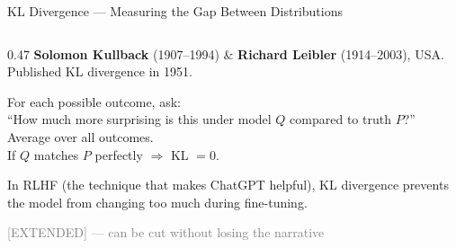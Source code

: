 \begin{frame}[shrink=22]{KL Divergence --- Measuring the Gap Between Distributions}

  \begin{columns}[T]
    \begin{column}{0.47\textwidth}
      {\footnotesize
      \textbf{Solomon Kullback} (1907--1994) \&
      \textbf{Richard Leibler} (1914--2003), USA.\\
      Published KL divergence in 1951.}

      \vspace{0.3em}
      \begin{tcolorbox}[colback=aiViolet!5, colframe=aiViolet!60,
        fonttitle=\bfseries\small, title={Recipe: KL Divergence},
        rounded corners, boxrule=0.5pt, left=3pt, right=3pt, top=2pt, bottom=2pt]
        \footnotesize
        For each possible outcome, ask:\\
        ``How much more surprising is this under model $Q$ compared to
        truth $P$?''\\[3pt]
        Average over all outcomes.\\[3pt]
        If $Q$ matches $P$ perfectly $\Rightarrow$ KL $= 0$.
      \end{tcolorbox}

      \vspace{0.3em}
      \begin{insightbox}
        In RLHF (the technique that makes ChatGPT helpful), KL divergence
        prevents the model from changing too much during fine-tuning.
      \end{insightbox}

      \vspace{0.2em}
      {\footnotesize\textcolor{gray}{[EXTENDED] --- can be cut without
      losing the narrative}}
    \end{column}


\end{columns}
\end{frame}
